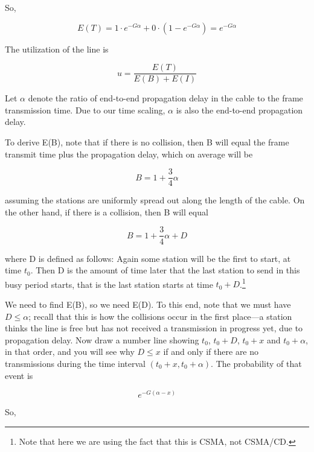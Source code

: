 \documentclass[11pt]{article}
\begin{document}
So, 

\begin{equation}
E(T) = 1 \cdot e^{-G \alpha} + 0 \cdot (1 - e^{-G \alpha}) = e^{-G \alpha}
\end{equation}

The utilization of the line is

\begin{equation}
u = \frac{E(T)}{E(B) + E(I)}
\end{equation}

Let $\alpha$ denote the ratio of end-to-end propagation delay in the
cable to the frame transmission time.  Due to our time scaling, $\alpha$
is also the end-to-end propagation delay.

To derive E(B), note that if there is no collision, then B will equal
the frame transmit time plus the propagation delay, which on average
will be

\begin{equation}
B = 1 + \frac{3}{4} \alpha
\end{equation}

assuming the stations are uniformly spread out along the length of the
cable.  On the other hand, if there is a collision, then B will equal

\begin{equation}
B = 1 + \frac{3}{4} \alpha + D
\end{equation}

where D is defined as follows:  Again some station will be the first to
start, at time $t_0$.  Then D is the amount of time later that the last 
station to send in this busy period starts, that is the last station
starts at time $t_0 + D$.\footnote{Note that here we are using the
fact that this is CSMA, not CSMA/CD.}

We need to find E(B), so we need E(D).  To this end, note that we must
have $D \le \alpha$; recall that this is how the collisions occur in the
first place---a station thinks the line is free but has not received a
transmission in progress yet, due to propagation delay.  Now draw a
number line showing $t_0$, $t_0+D$, $t_0+x$ and $t_0+\alpha$, in that
order, and you will see why $D \le x$ if and only if there are no
transmissions during the time interval $(t_0+x,t_0+\alpha)$.  The
probability of that event is

\begin{equation}
e^{-G(\alpha - x)}
\end{equation}

So, 
\end{document}
